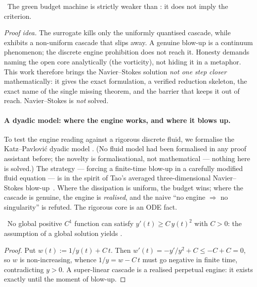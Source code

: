\begin{theorem}\label{thm:greenBudget_strictly_weaker_than_vorticityControl}
\green{}\ The green budget machine is strictly weaker than : it does not
imply the criterion. 
\end{theorem}

\emph{Proof idea.} The surrogate  kills only the uniformly quantised
cascade, while  exhibits a non-uniform cascade that slips
away. A genuine blow-up is a continuum phenomenon; the discrete engine prohibition does not reach
it. Honesty demands naming the open core analytically (the vorticity), not hiding it in a metaphor.
This work therefore brings the Navier--Stokes solution \emph{not one step closer} mathematically:
it gives the exact formulation, a verified reduction skeleton, the exact name of the single missing
theorem, and the barrier that keeps it out of reach. Navier--Stokes is \emph{not} solved.

\paragraph{A dyadic model: where the engine works, and where it blows up.}
To test the engine reading against a rigorous discrete fluid, we formalise the Katz--Pavlovi\'c
dyadic model \cite{katz-pavlovic2005}. (No fluid model had been formalised in any proof assistant
before; the novelty is formalisational, not mathematical --- nothing here is solved.) The strategy
--- forcing a finite-time blow-up in a carefully modified fluid equation --- is in the spirit of
Tao's averaged three-dimensional {Navier--Stokes} blow-up~\cite{tao2016}. Where the
dissipation is uniform, the budget wins; where the cascade is genuine, the engine is
\emph{realised}, and the naive ``no engine $\Rightarrow$ no singularity'' is refuted. The rigorous
core is an ODE fact.

\begin{theorem}\label{thm:superlinear_blowup_sq}
\green{}\ No global positive $C^1$ function can satisfy $y'(t) \ge C\,y(t)^2$ with $C > 0$: the
assumption of a global solution yields . 
\end{theorem}

\begin{proof}
Put $w(t) := 1/y(t) + C\,t$. Then $w'(t) = -y'/y^2 + C \le -C + C = 0$, so $w$ is non-increasing,
whence $1/y = w - C\,t$ must go negative in finite time, contradicting $y > 0$. A super-linear
cascade is a realised perpetual engine: it exists exactly until the moment of blow-up.
\end{proof}

